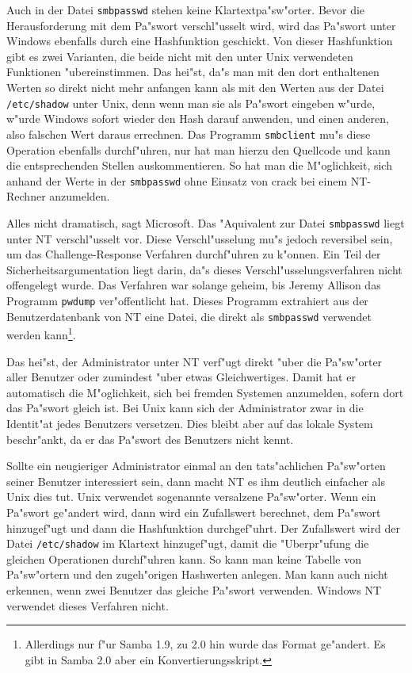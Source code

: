 \documentclass{scrartcl}
\newcommand{\prog}{\texttt}
\newcommand{\datei}{\texttt}
\begin{document}
Auch in der Datei \datei{smbpasswd} stehen keine
Klartextpa"sw"orter. Bevor die Herausforderung mit dem Pa"swort
verschl"usselt wird, wird das Pa"swort unter Windows ebenfalls durch
eine Hashfunktion geschickt. Von dieser Hashfunktion gibt es zwei
Varianten, die beide nicht mit den unter Unix verwendeten Funktionen
"ubereinstimmen. Das hei"st, da"s man mit den dort enthaltenen Werten
so direkt nicht mehr anfangen kann als mit den Werten aus der Datei
\datei{/etc/shadow} unter Unix, denn wenn man sie als Pa"swort
eingeben w"urde, w"urde Windows sofort wieder den Hash darauf anwenden,
und einen anderen, also falschen Wert daraus errechnen. Das Programm
\prog{smbclient} mu"s diese Operation ebenfalls durchf"uhren, nur hat
man hierzu den Quellcode und kann die entsprechenden Stellen
auskommentieren. So hat man die M"oglichkeit, sich anhand der Werte in
der \datei{smbpasswd} ohne Einsatz von crack bei einem NT-Rechner
anzumelden.

Alles nicht dramatisch, sagt Microsoft. Das "Aquivalent zur Datei
\datei{smbpasswd} liegt unter NT verschl"usselt vor. Diese
Verschl"usselung mu"s jedoch reversibel sein, um das
Challenge-Response Verfahren durchf"uhren zu k"onnen. Ein Teil der
Sicherheitsargumentation liegt darin, da"s dieses
Verschl"usselungsverfahren nicht offengelegt wurde. Das Verfahren war
solange geheim, bis Jeremy Allison das Programm \prog{pwdump}
ver"offentlicht hat. Dieses Programm extrahiert aus der
Benutzerdatenbank von NT eine Datei, die direkt als \datei{smbpasswd}
verwendet werden kann\footnote{Allerdings nur f"ur Samba 1.9, zu 2.0
  hin wurde das Format ge"andert. Es gibt in Samba 2.0 aber ein
  Konvertierungsskript.}.

Das hei"st, der Administrator unter NT verf"ugt direkt "uber die
Pa"sw"orter aller Benutzer oder zumindest "uber etwas Gleichwertiges.
Damit hat er automatisch die M"oglichkeit, sich bei fremden Systemen
anzumelden, sofern dort das Pa"swort gleich ist. Bei Unix kann sich
der Administrator zwar in die Identit"at jedes Benutzers versetzen.
Dies bleibt aber auf das lokale System beschr"ankt, da er das Pa"swort
des Benutzers nicht kennt.

Sollte ein neugieriger Administrator einmal an den tats"achlichen
Pa"sw"orten seiner Benutzer interessiert sein, dann macht NT es ihm
deutlich einfacher als Unix dies tut. Unix verwendet sogenannte
versalzene Pa"sw"orter. Wenn ein Pa"swort ge"andert wird, dann wird
ein Zufallswert berechnet, dem Pa"swort hinzugef"ugt und dann die
Hashfunktion durchgef"uhrt. Der Zufallswert wird der Datei
\datei{/etc/shadow} im Klartext hinzugef"ugt, damit die "Uberpr"ufung
die gleichen Operationen durchf"uhren kann. So kann man keine Tabelle
von Pa"sw"ortern und den zugeh"origen Hashwerten anlegen. Man kann
auch nicht erkennen, wenn zwei Benutzer das gleiche Pa"swort
verwenden. Windows NT verwendet dieses Verfahren nicht.
\end{document}
